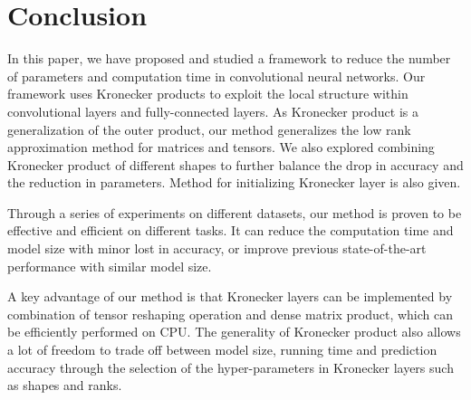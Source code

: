 \documentclass{article}
\begin{document}
\section{Conclusion}
In this paper, we have proposed and studied a framework to reduce the number of parameters and computation time in convolutional neural networks. Our
framework uses Kronecker products to exploit the local structure within convolutional layers and fully-connected layers. As Kronecker product is a
generalization of the outer product, our method generalizes the low rank approximation method for matrices and tensors. We also explored combining
Kronecker product of different shapes to further balance the drop in accuracy and the reduction in parameters. Method for initializing Kronecker layer is also given.

Through a series of experiments on different datasets, our method is proven to be effective and efficient on different tasks.
It can reduce the computation time and model size with minor lost in accuracy, or improve previous state-of-the-art performance with similar model size.

A key advantage of our method is that Kronecker layers can be implemented by combination of tensor reshaping operation and dense matrix product, which can be efficiently performed on CPU. The generality of Kronecker product also allows a lot of freedom to trade off between model size, running time and prediction accuracy through the selection of the hyper-parameters in Kronecker layers such as shapes and ranks.



\fontsize{9.5pt}{10.5pt} \selectfont

\end{document}
